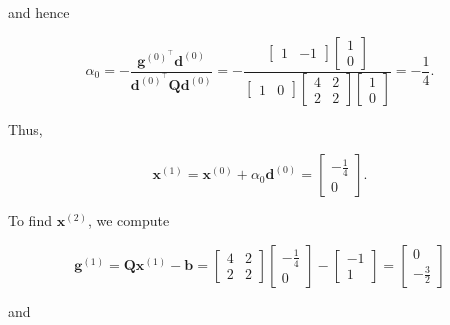 and hence

\[
	\alpha_{0}=-\dfrac{\boldsymbol{g}^{(0)^{\top}} \boldsymbol{d}^{(0)}}{\boldsymbol{d}^{(0)^{\top}} \boldsymbol{Q} \boldsymbol{d}^{(0)}}=-\dfrac{\left[\begin{array}{ll}
			1 & -1
		\end{array}\right]\left[\begin{array}{l}
			1 \\
			0
		\end{array}\right]}{\left[\begin{array}{ll}
			1 & 0
		\end{array}\right]\left[\begin{array}{ll}
			4 & 2 \\
			2 & 2
		\end{array}\right]\left[\begin{array}{l}
			1 \\
			0
		\end{array}\right]}=-\frac{1}{4} .
\]

Thus,

\[
	\boldsymbol{x}^{(1)}=\boldsymbol{x}^{(0)}+\alpha_{0} \boldsymbol{d}^{(0)}=\left[\begin{array}{c}
		-\frac{1}{4} \\
		0
	\end{array}\right] .
\]

To find \(\boldsymbol{x}^{(2)}\), we compute

\[
	\boldsymbol{g}^{(1)}=\boldsymbol{Q} \boldsymbol{x}^{(1)}-\boldsymbol{b}=\left[\begin{array}{ll}
		4 & 2 \\
		2 & 2
	\end{array}\right]\left[\begin{array}{c}
		-\frac{1}{4} \\
		0
	\end{array}\right]-\left[\begin{array}{c}
		-1 \\
		1
	\end{array}\right]=\left[\begin{array}{c}
		0 \\
		-\frac{3}{2}
	\end{array}\right]
\]

and

